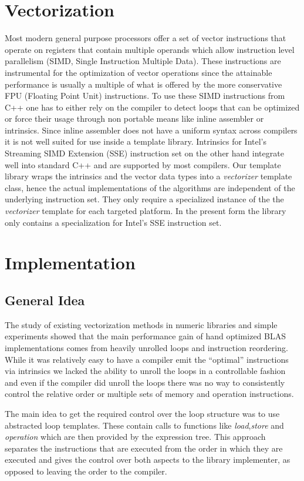 \documentclass[12pt]{article}
\begin{document}
\section{Vectorization}

Most modern general purpose processors offer a set of vector instructions that
operate on registers that contain multiple operands which allow instruction
level parallelism (SIMD, Single Instruction Multiple Data). These instructions
are instrumental for the optimization of vector operations since the attainable
performance is usually a multiple of what is offered by the more conservative
FPU (Floating Point Unit) instructions. To use these SIMD
instructions from C++ one has to either rely on the compiler to detect loops
that can be optimized or force their usage through non portable means
like inline assembler or intrinsics.
Since inline assembler does not have a uniform syntax across compilers it is not
well suited for use inside a template library. Intrinsics for Intel's Streaming SIMD Extension (SSE)
instruction set on the other hand integrate well into standard C++ and are
supported by most compilers.
Our template library wraps the intrinsics and the vector data types into a
\emph{vectorizer} template class, hence the actual implementations of the algorithms are
independent of the underlying instruction set. They only require a specialized
instance of the the \emph{vectorizer} template for each targeted platform.
In the present form the library only contains a specialization for Intel's SSE
instruction set.

\section{Implementation}
\subsection{General Idea}
The study of existing vectorization methods in numeric libraries and simple
experiments showed that the main performance gain of hand optimized BLAS
implementations comes from heavily unrolled loops and instruction reordering.
While it was relatively easy to have a compiler emit the ``optimal''
instructions via intrinsics we lacked the ability to unroll
the loops in a controllable fashion and even if the compiler did unroll the
loops there was no way to consistently control the relative order or multiple
sets of memory and operation instructions.

The main idea to get the required control over the loop structure was to
use abstracted loop templates. These contain calls to functions
like \emph{load},\emph{store} and \emph{operation} which are then provided
by the expression tree. This approach separates the instructions that
are executed from the order in which they are executed and gives the control
over both aspects to the library implementer, as opposed to leaving the order
to the compiler.
\end{document}
